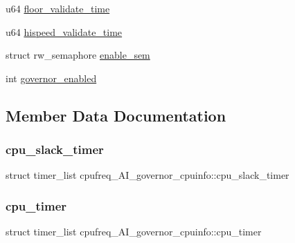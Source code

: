 \begin{DoxyCompactItemize}
\item 
u64 \hyperlink{structcpufreq__AI__governor__cpuinfo_acd1311c4762ce6545c7bd363065ed2f3}{floor\+\_\+validate\+\_\+time}
\item 
u64 \hyperlink{structcpufreq__AI__governor__cpuinfo_a42483387ecb4f48073ea912d8cfa203a}{hispeed\+\_\+validate\+\_\+time}
\item 
struct rw\+\_\+semaphore \hyperlink{structcpufreq__AI__governor__cpuinfo_af852bb902bb2091547a97b3f1384dc68}{enable\+\_\+sem}
\item 
int \hyperlink{structcpufreq__AI__governor__cpuinfo_a76845b450e1f8d444596477834ce1383}{governor\+\_\+enabled}
\end{DoxyCompactItemize}


\subsection{Member Data Documentation}
\mbox{\label{structcpufreq__AI__governor__cpuinfo_a14b7938eb7221e94229b1f9c6b7b8a1f}} 
\subsubsection{\texorpdfstring{cpu\+\_\+slack\+\_\+timer}{cpu\_slack\_timer}}
{\footnotesize\ttfamily struct timer\+\_\+list cpufreq\+\_\+\+A\+I\+\_\+governor\+\_\+cpuinfo\+::cpu\+\_\+slack\+\_\+timer}

\mbox{\label{structcpufreq__AI__governor__cpuinfo_a9d3787cd4f9ba35254402479d7f34f0a}} 
\subsubsection{\texorpdfstring{cpu\+\_\+timer}{cpu\_timer}}
{\footnotesize\ttfamily struct timer\+\_\+list cpufreq\+\_\+\+A\+I\+\_\+governor\+\_\+cpuinfo\+::cpu\+\_\+timer}

